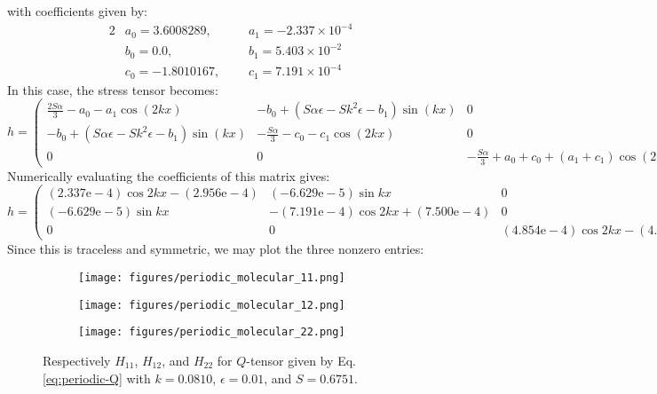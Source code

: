 \documentclass[reqno]{article}
\begin{document}
with coefficients given by:
\begin{alignat}{2}
  &a_0 = 3.6008289, \:\:\:
        &&a_1 = -2.337\times 10^{-4} \\
  &b_0 = 0.0, \:\:\:
        &&b_1 = 5.403\times 10^{-2} \\
  &c_0 = -1.8010167, \:\:\:
        &&c_1 = 7.191\times 10^{-4}
\end{alignat}
In this case, the stress tensor becomes:
\begin{equation}
  h
  =
  \left(
    \begin{matrix}
      \frac{2 S \alpha}{3} - a_{0} - a_{1} \cos{\left(2 k x \right)}
      & - b_{0} + \left(S \alpha \epsilon - S k^{2} \epsilon - b_{1}\right) \sin{\left(k x \right)}
      & 0 \\
      - b_{0} + \left(S \alpha \epsilon - S k^{2} \epsilon - b_{1}\right) \sin{\left(k x \right)}
      & - \frac{S \alpha}{3} - c_{0} - c_{1} \cos{\left(2 k x \right)}
      & 0 \\
      0
      & 0
      & - \frac{S \alpha}{3} + a_{0} + c_{0} + \left(a_{1} + c_{1}\right) \cos{\left(2 k x \right)}
    \end{matrix}
  \right)
\end{equation}
Numerically evaluating the coefficients of this matrix gives:
\begin{equation}
  h
  =
  \begin{pmatrix}
    (2.337\text{e}-4) \cos 2kx - (2.956 \text{e}-4)
    & (-6.629 \text{e}-5) \sin kx
    &0 \\
    (-6.629 \text{e}-5) \sin kx
    & -(7.191 \text{e}-4) \cos 2kx + (7.500 \text{e}-4)
    &0 \\
    0
    &0
    &(4.854 \text{e}-4) \cos 2kx - (4.545 \text{e}-4)
  \end{pmatrix}
\end{equation}
Since this is traceless and symmetric, we may plot the three nonzero entries:
\begin{figure}[H] 
  \centering
  \begin{subfigure}{0.45\textwidth}
    \texttt{[image: figures/periodic\_molecular\_11.png]}
    \caption{}
    \label{fig:periodic-molecular-11}
  \end{subfigure}
  \hfill
  \begin{subfigure}{0.45\textwidth}
    \texttt{[image: figures/periodic\_molecular\_12.png]}
    \caption{}
    \label{fig:periodic-molecular-12}
  \end{subfigure}
  \hfill
  \begin{subfigure}{0.45\textwidth}
    \texttt{[image: figures/periodic\_molecular\_22.png]}
    \caption{}
    \label{fig:periodic-molecular-22}
  \end{subfigure}
  \caption{Respectively $H_{11}$, $H_{12}$, and $H_{22}$
    for $Q$-tensor given by Eq. \eqref{eq:periodic-Q}
    with $k = 0.0810$, $\epsilon = 0.01$, and $S = 0.6751$.}
  \label{fig:periodic-molecular-tensor}
\end{figure}
\end{document}
